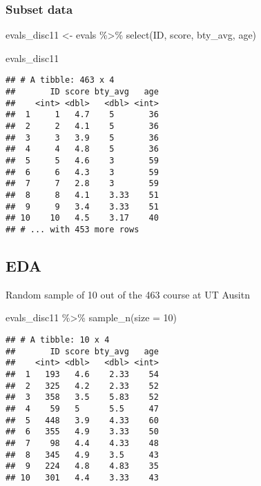 \documentclass[
]{article}
\newenvironment{Shaded}{\begin{snugshade}}{\end{snugshade}}
\newcommand{\AttributeTok}[1]{\textcolor[rgb]{0.77,0.63,0.00}{#1}}
\newcommand{\DecValTok}[1]{\textcolor[rgb]{0.00,0.00,0.81}{#1}}
\newcommand{\FunctionTok}[1]{\textcolor[rgb]{0.00,0.00,0.00}{#1}}
\newcommand{\NormalTok}[1]{#1}
\newcommand{\OtherTok}[1]{\textcolor[rgb]{0.56,0.35,0.01}{#1}}
\newcommand{\SpecialCharTok}[1]{\textcolor[rgb]{0.00,0.00,0.00}{#1}}
\begin{document}
\hypertarget{subset-data}{%
\subsubsection{Subset data}\label{subset-data}}

\begin{Shaded}
\begin{Highlighting}[]
\NormalTok{evals\_disc11 }\OtherTok{\textless{}{-}}\NormalTok{ evals }\SpecialCharTok{\%\textgreater{}\%} 
  \FunctionTok{select}\NormalTok{(ID, score, bty\_avg, age)}

\NormalTok{evals\_disc11}
\end{Highlighting}
\end{Shaded}

\begin{verbatim}
## # A tibble: 463 x 4
##       ID score bty_avg   age
##    <int> <dbl>   <dbl> <int>
##  1     1   4.7    5       36
##  2     2   4.1    5       36
##  3     3   3.9    5       36
##  4     4   4.8    5       36
##  5     5   4.6    3       59
##  6     6   4.3    3       59
##  7     7   2.8    3       59
##  8     8   4.1    3.33    51
##  9     9   3.4    3.33    51
## 10    10   4.5    3.17    40
## # ... with 453 more rows
\end{verbatim}

\hypertarget{eda}{%
\subsection{EDA}\label{eda}}

Random sample of 10 out of the 463 course at UT Ausitn

\begin{Shaded}
\begin{Highlighting}[]
\NormalTok{evals\_disc11 }\SpecialCharTok{\%\textgreater{}\%} 
  \FunctionTok{sample\_n}\NormalTok{(}\AttributeTok{size =} \DecValTok{10}\NormalTok{)}
\end{Highlighting}
\end{Shaded}

\begin{verbatim}
## # A tibble: 10 x 4
##       ID score bty_avg   age
##    <int> <dbl>   <dbl> <int>
##  1   193   4.6    2.33    54
##  2   325   4.2    2.33    52
##  3   358   3.5    5.83    52
##  4    59   5      5.5     47
##  5   448   3.9    4.33    60
##  6   355   4.9    3.33    50
##  7    98   4.4    4.33    48
##  8   345   4.9    3.5     43
##  9   224   4.8    4.83    35
## 10   301   4.4    3.33    43
\end{verbatim}
\end{document}
